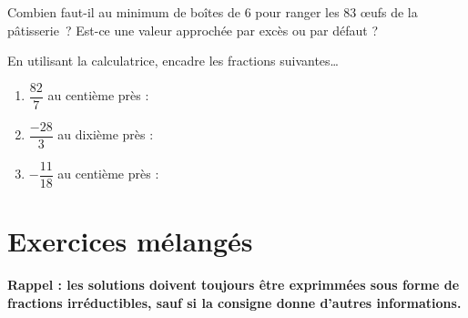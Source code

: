 \documentclass[../../syllabus_2.tex]{subfiles}
\begin{document}
\bigbreak
\begin{exercise}
  Combien faut-il au minimum de boîtes de $6$ pour ranger les $83$ {\oe}ufs de la pâtisserie~? Est-ce une valeur approchée par excès ou par défaut ?
\end{exercise}
\vspace*{8cm}

\begin{exercise}
  En utilisant la calculatrice, encadre les fractions suivantes\dots
  \begin{enumerate}[itemsep=1cm]
    \item $\dfrac{82}{7}$ au centième près :
    \item $\dfrac{-28}{3}$ au dixième près :
    \item $-\dfrac{11}{18}$ au centième près :
  \end{enumerate}
\end{exercise}

\newpage
\section{Exercices mélangés}
\textbf{Rappel : les solutions doivent toujours être exprimmées sous forme de fractions irréductibles, sauf si la consigne donne d'autres informations.}
\end{document}
